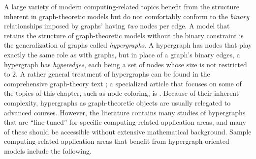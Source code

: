 A large variety of modern computing-related topics benefit from the
structure inherent in graph-theoretic models but do not comfortably
conform to the {\em binary} relationships imposed by graphs' having
{\em two} nodes per edge.  A model that retains the structure of
graph-theoretic models without the binary constraint is the
generalization of graphs called {\em hypergraphs}.  A hypergraph has
nodes that play exactly the same role as with graphs, but in place of
a graph's binary edges, a hypergraph has {\em hyperedges}, each being
a set of nodes whose size is not restricted to $2$.  A rather general
treatment of hypergraphs can be found in the comprehensive
graph-theory text \cite{Berge73}; a specialized article that focuses
on some of the topics of this chapter, such as node-coloring, is
\cite{Lovasz73}.  Because of their inherent complexity, hypergraphs as
graph-theoretic objects are usually relegated to advanced courses.
However, the literature contains many studies of hypergraphs that are
``fine-tuned'' for specific computing-related application areas, and
many of these should be accessible without extensive mathematical
background.  Sample  computing-related application areas that benefit
from hypergraph-oriented models include the following.

